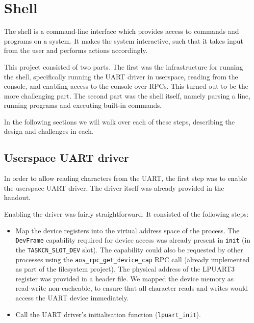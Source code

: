 \chapter{Shell}

The shell is a command-line interface which provides access to commands and programs on a system.
It makes the system interactive, such that it takes input from the user and performs actions accordingly.

This project consisted of two parts.
The first was the infrastructure for running the shell, specifically running the UART driver in userspace, reading from the console, and enabling access to the console over RPCs.
This turned out to be the more challenging part.
The second part was the shell itself, namely parsing a line, running programs and executing built-in commands.

In the following sections we will walk over each of these steps, describing the design and challenges in each.


\section{Userspace UART driver}

In order to allow reading characters from the UART, the first step was to enable the userspace UART driver.
The driver itself was already provided in the handout.

Enabling the driver was fairly straightforward. It consisted of the following steps:
\begin{itemize}

    \item
        Map the device registers into the virtual address space of the process.
        The \verb|DevFrame| capability required for device access was already present in \verb|init| (in the \verb|TASKCN_SLOT_DEV| slot).
        The capability could also be requested by other processes using the \verb|aos_rpc_get_device_cap| RPC call (already implemented as part of the filesystem project).
        The physical address of the LPUART3 register was provided in a header file.
        We mapped the device memory as read-write non-cacheable, to ensure that all character reads and writes would access the UART device immediately.

    \item
        Call the UART driver's initialisation function (\verb|lpuart_init|).

\end{itemize}


